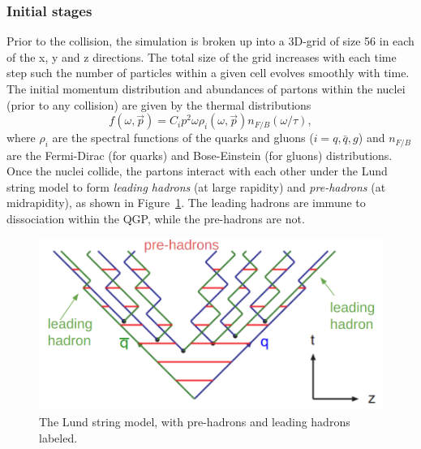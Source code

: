\subsubsection{Initial stages}
Prior to the collision, the simulation is broken up into a 3D-grid of size 56 in each of the x, y and z directions. The total size of the grid increases with each time step such the number of particles within a given cell evolves smoothly with time. The initial momentum distribution and abundances of partons within the nuclei (prior to any collision) are given by the thermal distributions
\begin{equation}
    f(\omega, \vec{p}) = C_i p^2 \omega \rho_i(\omega, \vec{p}) n_{F / B}(\omega / \tau),
\end{equation}
where $\rho_i$ are the spectral functions of the quarks and gluons ($i = q, \bar{q}, g$) and $n_{F / B}$ are the Fermi-Dirac (for quarks) and Bose-Einstein (for gluons) distributions. Once the nuclei collide, the partons interact with each other under the Lund string model to form \textit{leading hadrons} (at large rapidity) and \textit{pre-hadrons} (at midrapidity), as shown in Figure~\ref{fig:lund_string_phsd}. The leading hadrons are immune to dissociation within the QGP, while the pre-hadrons are not. 

\begin{figure}[ht]
    \centering
    \includegraphics[width=0.5\linewidth]{figures/introduction/lund_string_phsd.png}
    \caption{The Lund string model, with pre-hadrons and leading hadrons labeled.}
    \label{fig:lund_string_phsd}
\end{figure}

